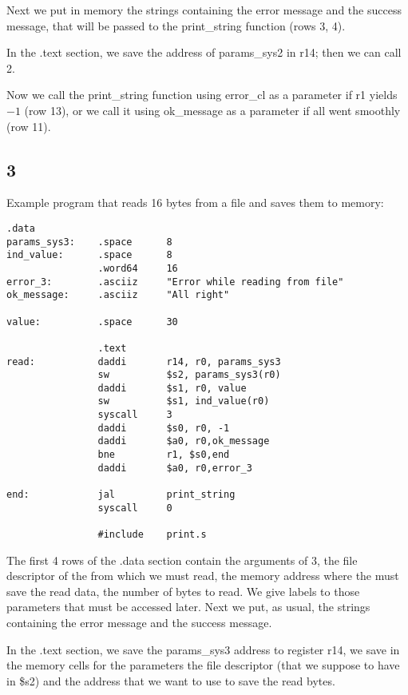 Next we put in memory the strings containing the error message and the success
message, that will be passed to the print\_string function (rows 3, 4).

In the .text section, we save the address of params\_sys2 in r14; then we can
call \SC{} 2.

Now we call the print\_string function using error\_cl as a parameter if r1
yields $-1$ (row 13), or we call it using ok\_message as a parameter if all went
smoothly (row 11).

\OF{}

\subsection{\SC{} 3}
Example program that reads 16 bytes from a file and saves them to memory:
\begin{lstlisting}[caption={\SC{} 3 example}, label={code:syscall3}, style={mips}]
                .data
params_sys3:    .space      8                
ind_value:      .space      8            
                .word64     16        
error_3:        .asciiz     "Error while reading from file"    
ok_message:     .asciiz     "All right"    

value:          .space      30                    

                .text
read:           daddi       r14, r0, params_sys3 
                sw          $s2, params_sys3(r0)
                daddi       $s1, r0, value            
                sw          $s1, ind_value(r0)            
                syscall     3            
                daddi       $s0, r0, -1            
                daddi       $a0, r0,ok_message            
                bne         r1, $s0,end            
                daddi       $a0, r0,error_3

end:            jal         print_string
                syscall     0
        
                #include    print.s 
\end{lstlisting}
The first 4 rows of the .data section contain the arguments of \SC{} 3, the file
descriptor of the from which we must read, the memory address where the \SC{}
must save the read data, the number of bytes to read. We give labels to those
parameters that must be accessed later.  Next we put, as usual, the strings
containing the error message and the success message.

In the .text section, we save the params\_sys3 address to register r14, we save
in the memory cells for the \SC{} parameters the file descriptor (that we
suppose to have in \$s2) and the address that we want to use to save the read
bytes.

